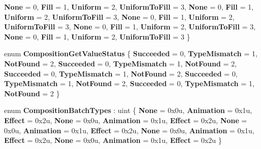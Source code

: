 \begin{DoxyCompactItemize}
{\bfseries None} = 0, 
{\bfseries Fill} = 1, 
{\bfseries Uniform} = 2, 
{\bfseries Uniform\+To\+Fill} = 3, 
\newline
{\bfseries None} = 0, 
{\bfseries Fill} = 1, 
{\bfseries Uniform} = 2, 
{\bfseries Uniform\+To\+Fill} = 3, 
\newline
{\bfseries None} = 0, 
{\bfseries Fill} = 1, 
{\bfseries Uniform} = 2, 
{\bfseries Uniform\+To\+Fill} = 3, 
\newline
{\bfseries None} = 0, 
{\bfseries Fill} = 1, 
{\bfseries Uniform} = 2, 
{\bfseries Uniform\+To\+Fill} = 3, 
\newline
{\bfseries None} = 0, 
{\bfseries Fill} = 1, 
{\bfseries Uniform} = 2, 
{\bfseries Uniform\+To\+Fill} = 3
 \}
\item 
\mbox{\label{namespace_windows_1_1_u_i_1_1_composition_a9ddfa4d3a911ddf582cee8e20b4e8748}} 
enum {\bfseries Composition\+Get\+Value\+Status} \{ \newline
{\bfseries Succeeded} = 0, 
{\bfseries Type\+Mismatch} = 1, 
{\bfseries Not\+Found} = 2, 
{\bfseries Succeeded} = 0, 
\newline
{\bfseries Type\+Mismatch} = 1, 
{\bfseries Not\+Found} = 2, 
{\bfseries Succeeded} = 0, 
{\bfseries Type\+Mismatch} = 1, 
\newline
{\bfseries Not\+Found} = 2, 
{\bfseries Succeeded} = 0, 
{\bfseries Type\+Mismatch} = 1, 
{\bfseries Not\+Found} = 2, 
\newline
{\bfseries Succeeded} = 0, 
{\bfseries Type\+Mismatch} = 1, 
{\bfseries Not\+Found} = 2
 \}
\item 
\mbox{\label{namespace_windows_1_1_u_i_1_1_composition_aee18d765e5fb2f69e4c1656c628cd576}} 
enum {\bfseries Composition\+Batch\+Types} \+: uint \{ \newline
{\bfseries None} = 0x0u, 
{\bfseries Animation} = 0x1u, 
{\bfseries Effect} = 0x2u, 
{\bfseries None} = 0x0u, 
\newline
{\bfseries Animation} = 0x1u, 
{\bfseries Effect} = 0x2u, 
{\bfseries None} = 0x0u, 
{\bfseries Animation} = 0x1u, 
\newline
{\bfseries Effect} = 0x2u, 
{\bfseries None} = 0x0u, 
{\bfseries Animation} = 0x1u, 
{\bfseries Effect} = 0x2u, 
\newline
{\bfseries None} = 0x0u, 
{\bfseries Animation} = 0x1u, 
{\bfseries Effect} = 0x2u
 \}
\item 

\end{DoxyCompactItemize}
